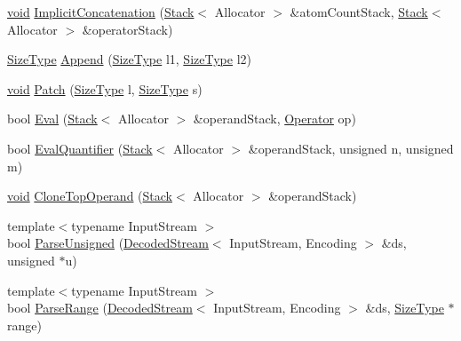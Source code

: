 \begin{DoxyCompactItemize}
\item 
\hyperlink{imgui__impl__opengl3__loader_8h_ac668e7cffd9e2e9cfee428b9b2f34fa7}{void} \hyperlink{classinternal_1_1GenericRegex_a3b6d21989c3e41e33f6d2a7897ffdd6b}{Implicit\+Concatenation} (\hyperlink{classinternal_1_1Stack}{Stack}$<$ Allocator $>$ \&atom\+Count\+Stack, \hyperlink{classinternal_1_1Stack}{Stack}$<$ Allocator $>$ \&operator\+Stack)
\item 
\hyperlink{rapidjson_8h_a5ed6e6e67250fadbd041127e6386dcb5}{Size\+Type} \hyperlink{classinternal_1_1GenericRegex_a96b270e845e58787b624604531598517}{Append} (\hyperlink{rapidjson_8h_a5ed6e6e67250fadbd041127e6386dcb5}{Size\+Type} l1, \hyperlink{rapidjson_8h_a5ed6e6e67250fadbd041127e6386dcb5}{Size\+Type} l2)
\item 
\hyperlink{imgui__impl__opengl3__loader_8h_ac668e7cffd9e2e9cfee428b9b2f34fa7}{void} \hyperlink{classinternal_1_1GenericRegex_a90c5c230de4794560971c48e15861f8e}{Patch} (\hyperlink{rapidjson_8h_a5ed6e6e67250fadbd041127e6386dcb5}{Size\+Type} l, \hyperlink{rapidjson_8h_a5ed6e6e67250fadbd041127e6386dcb5}{Size\+Type} s)
\item 
bool \hyperlink{classinternal_1_1GenericRegex_a0cc7e9e0fa434ded7ed37de54c49ce26}{Eval} (\hyperlink{classinternal_1_1Stack}{Stack}$<$ Allocator $>$ \&operand\+Stack, \hyperlink{classinternal_1_1GenericRegex_acd9c0338546415c6d6dabdb76f8be673}{Operator} op)
\item 
bool \hyperlink{classinternal_1_1GenericRegex_a71f934ac6c4b2b4f63b0c5fc68797933}{Eval\+Quantifier} (\hyperlink{classinternal_1_1Stack}{Stack}$<$ Allocator $>$ \&operand\+Stack, unsigned n, unsigned m)
\item 
\hyperlink{imgui__impl__opengl3__loader_8h_ac668e7cffd9e2e9cfee428b9b2f34fa7}{void} \hyperlink{classinternal_1_1GenericRegex_a44a907caf47179a3f0edcf46a4be8b2f}{Clone\+Top\+Operand} (\hyperlink{classinternal_1_1Stack}{Stack}$<$ Allocator $>$ \&operand\+Stack)
\item 
{\footnotesize template$<$typename Input\+Stream $>$ }\\bool \hyperlink{classinternal_1_1GenericRegex_a16d0bf927741c666f46eed1c66f04150}{Parse\+Unsigned} (\hyperlink{classinternal_1_1DecodedStream}{Decoded\+Stream}$<$ Input\+Stream, Encoding $>$ \&ds, unsigned $\ast$u)
\item 
{\footnotesize template$<$typename Input\+Stream $>$ }\\bool \hyperlink{classinternal_1_1GenericRegex_aa7336514ba21536ec90aaf2188581c1e}{Parse\+Range} (\hyperlink{classinternal_1_1DecodedStream}{Decoded\+Stream}$<$ Input\+Stream, Encoding $>$ \&ds, \hyperlink{rapidjson_8h_a5ed6e6e67250fadbd041127e6386dcb5}{Size\+Type} $\ast$range)

\end{DoxyCompactItemize}
